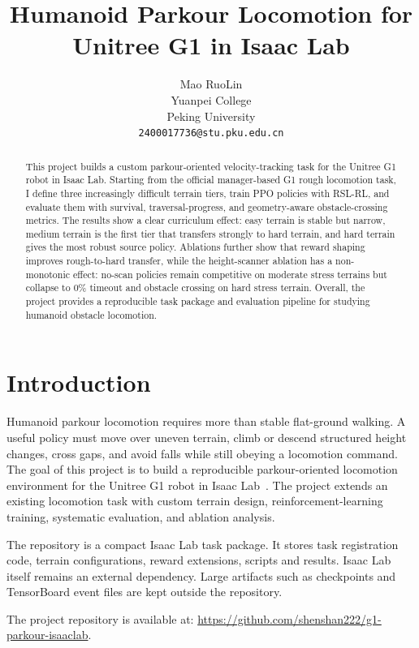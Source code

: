 \documentclass{article}
\title{Humanoid Parkour Locomotion for Unitree G1 in Isaac Lab}
\author{%
  Mao RuoLin \\
  Yuanpei College \\
  Peking University \\
  \texttt{2400017736@stu.pku.edu.cn} \\
}
\begin{document}
\maketitle

\begin{abstract}
This project builds a custom parkour-oriented velocity-tracking task for the Unitree G1 robot in Isaac Lab. Starting from the official manager-based G1 rough locomotion task, I define three increasingly difficult terrain tiers, train PPO policies with RSL-RL, and evaluate them with survival, traversal-progress, and geometry-aware obstacle-crossing metrics. The results show a clear curriculum effect: easy terrain is stable but narrow, medium terrain is the first tier that transfers strongly to hard terrain, and hard terrain gives the most robust source policy. Ablations further show that reward shaping improves rough-to-hard transfer, while the height-scanner ablation has a non-monotonic effect: no-scan policies remain competitive on moderate stress terrains but collapse to 0\% timeout and obstacle crossing on hard stress terrain. Overall, the project provides a reproducible task package and evaluation pipeline for studying humanoid obstacle locomotion.
\end{abstract}

\section{Introduction}
\label{sec:introduction}

Humanoid parkour locomotion requires more than stable flat-ground walking. A useful policy must move over uneven terrain, climb or descend structured height changes, cross gaps, and avoid falls while still obeying a locomotion command. The goal of this project is to build a reproducible parkour-oriented locomotion environment for the Unitree G1 robot in Isaac Lab~\citep{mittal2025isaaclab}. The project extends an existing locomotion task with custom terrain design, reinforcement-learning training, systematic evaluation, and ablation analysis.

The repository is a compact Isaac Lab task package. It stores task registration code, terrain configurations, reward extensions, scripts and results. Isaac Lab itself remains an external dependency. Large artifacts such as checkpoints and TensorBoard event files are kept outside the repository.

The project repository is available at: \url{https://github.com/shenshan222/g1-parkour-isaaclab}.
\end{document}

